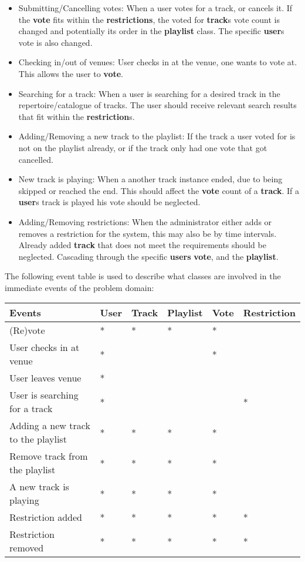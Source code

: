 \begin{itemize}
\item Submitting/Cancelling votes:
    When a user votes for a track, or cancels it. If the \textbf{vote} fits within the \textbf{restrictions}, the voted for \textbf{track}s vote count is changed and potentially its order in the \textbf{playlist} class. The specific \textbf{user}s vote is also changed.
\item Checking in/out of venues:
    User checks in at the venue, one wants to vote at. This allows the user to \textbf{vote}.
\item Searching for a track:
    When a user is searching for a desired track in the repertoire/catalogue of tracks. The user should receive relevant search results that fit within the \textbf{restriction}s.
\item Adding/Removing a new track to the playlist:
    If the track a user voted for is not on the playlist already, or if the track only had one vote that got cancelled.
\item New track is playing:
    When a another track instance ended, due to being skipped or reached the end. This should affect the \textbf{vote} count of a \textbf{track}. If a \textbf{user}s track is played his vote should be neglected.
\item Adding/Removing restrictions:
    When the administrator either adds or removes a restriction for the system, this may also be by time intervals. Already added \textbf{track} that does not meet the requirements should be neglected. Cascading through the specific \textbf{users} \textbf{vote}, and the \textbf{playlist}.
\end{itemize}

The following event table is used to describe what classes are involved in the immediate events of the problem domain:

\begin{center}
\label{eventtable}
    \begin{tabular}{|l|l|l|l|l|l|}
    \hline
    \textbf{Events} & User & Track & Playlist & Vote & Restriction \\ \hline
    (Re)vote & * & * & * & * &   \\ \hline
    User checks in at venue & * &   &   & * &   \\ \hline
    User leaves venue & * &   &   &   &   \\ \hline
    User is searching for a track & * &   &   &  & * \\ \hline
    Adding a new track to the playlist & * & * & * & * &   \\ \hline
    Remove track from the playlist & * & * & * & * &   \\ \hline
    A new track is playing & * & * & * & * &   \\ \hline
    Restriction added & * & * & * & * & * \\ \hline
    Restriction removed & * & * & * & * & * \\ \hline
    \end{tabular}
\end{center}

